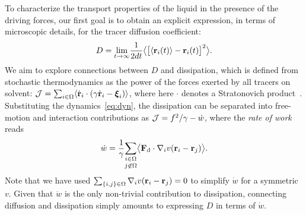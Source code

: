 \documentclass[pre, superscriptaddress, twocolumn,pre]{revtex4-1}
\begin{document}
To characterize the transport properties of the liquid in the presence of the driving forces, our first goal is to obtain an explicit expression, in terms of microscopic details, for the tracer diffusion coefficient:
\begin{equation}
	D = \underset{t\to\infty}{\lim} \frac{1}{2dt} \big\langle \big[\langle{\bf r}_i(t)\rangle-{\bf r}_i(t)\big]^2 \big\rangle .
\end{equation}
We aim to explore connections between $D$ and dissipation, which is defined from stochastic thermodynamics as the power of the forces exerted by all tracers on solvent: ${\cal J} = \sum_{i\in\Omega}\langle\dot{\bf r}_i\cdot(\gamma\dot{\bf r}_i-{\boldsymbol\xi}_i)\rangle$, where here $\cdot$ denotes a Stratonovich product~\cite{Sekimoto1998, Seifert2012}. Substituting the dynamics~\eqref{eq:dyn}, the dissipation can be separated into free-motion and interaction contributions as ${\cal J} = f^2/\gamma - \dot w$, where the {\it rate of work} reads
\begin{equation}\label{eq:work}
	\dot w = \frac{1}{\gamma} \underset{j\not\in\Omega}{\sum_{i\in\Omega}}\big\langle {\bf F}_{\rm d}\cdot\nabla_iv({\bf r}_i-{\bf r}_j)\big\rangle.
\end{equation}
Note that we have used $\sum_{\{i,j\}\in\Omega}\nabla_iv({\bf r}_i-{\bf r}_j)=0$ to simplify $\dot w$ for a symmetric $v$. Given that $\dot w$ is the only non-trivial contribution to dissipation, connecting diffusion and dissipation simply amounts to expressing $D$ in terms of $\dot w$.
\end{document}
